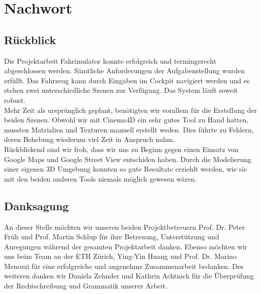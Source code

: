 \section{Nachwort}
\subsection{Rückblick}
Die Projektarbeit Fahrimulator konnte erfolgreich und termingerecht abgeschlossen werden. Sämtliche Anforderungen der Aufgabenstellung wurden erfüllt. Das Fahrzeug kann durch Eingaben im Cockpit navigiert werden und es stehen zwei unterschiedliche Szenen zur Verfügung. Das System läuft soweit robust.\\
Mehr Zeit als ursprünglich geplant, benötigten wir vorallem für die Erstellung der beiden Szenen. Obwohl wir mit Cinema4D ein sehr gutes Tool zu Hand hatten, mussten Matrialien und Texturen manuell erstellt weden. Dies führte zu Fehlern, deren Behebung wiederum viel Zeit in Anspruch nahm.\\
Rückblickend sind wir froh, dass wir uns zu Beginn gegen einen Einsatz von Google Maps und Google Street View entschiden haben. Durch die Modelierung einer eigenen 3D Umgebung konnten so gute Resultate erziehlt werden, wie sie mit den beiden anderen Tools niemals möglich gewesen wären. 
\subsection{Danksagung}
An dieser Stelle möchten wir unseren beiden Projektbetreuern Prof. Dr. Peter Früh und Prof. Martin Schlup für ihre Betreuung, Unterstützung und Anregungen während der gesamten Projektarbeit danken. Ebenso möchten wir uns beim Team an der ETH Zürich, Ying-Yin Huang und Prof. Dr. Marino Menozzi für eine erfolgreiche und angenehme Zusammenarbeit bedanken. Des weiteren danken wir Daniela Zehnder und Kathrin Achtnich für die Überprüfung der Rechtschreibung und Grammatik unserer Arbeit.
